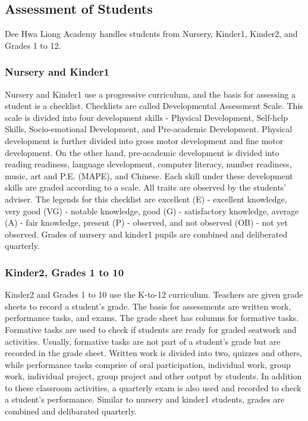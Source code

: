 \documentclass[11pt,a4paper,titlepage]{article}
\begin{document}
\subsection{Assessment of Students}
Dee Hwa Liong Academy handles students from Nursery, Kinder1, Kinder2, and Grades 1 to 12.

\subsubsection{Nursery and Kinder1}
Nursery and Kinder1 use a progressive curriculum, and the basis for assessing a student is a checklist. Checklists are called Developmental Assessment Scale. This scale is divided into four development skills - Physical Development, Self-help Skills, Socio-emotional Development, and Pre-academic Development. Physical development is further divided into gross motor development and fine motor development. On the other hand, pre-academic development is divided into reading readiness, language development, computer literacy, number readiness, music, art and P.E. (MAPE), and Chinese. Each skill under these development skills are graded according to a scale. All traits are observed by the students' adviser. The legends for this checklist are excellent (E) - excellent knowledge, very good (VG) - notable knowledge, good (G) - satisfactory knowledge, average (A) - fair knowledge, present (P) - observed, and not observed (OB) - not yet observed. Grades of nursery and kinder1 pupils are combined and deliberated quarterly.

\subsubsection{Kinder2, Grades 1 to 10}
Kinder2 and Grades 1 to 10 use the K-to-12 curriculum. Teachers are given grade sheets to record a student's grade. The basis for assessments are written work, performance tasks, and exams. The grade sheet has columns for formative tasks. Formative tasks are used to check if students are ready for graded seatwork and activities. Usually, formative tasks are not part of a student's grade but are recorded in the grade sheet. Written work is divided into two, quizzes and others, while performance tasks comprise of oral participation, individual work, group work, individual project, group project and other output by students. In addition to these classroom activities, a quarterly exam is also used and recorded to check a student's performance. Similar to nursery and kinder1 students, grades are combined and delibarated quarterly.
\end{document}

